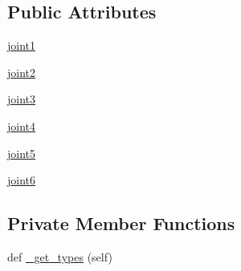 \subsection*{Public Attributes}
\begin{DoxyCompactItemize}
\item 
\hyperlink{classjaco__msgs_1_1msg_1_1__JointAngles_1_1JointAngles_a8be523d467fa53d4135c9d2886b97581}{joint1}
\item 
\hyperlink{classjaco__msgs_1_1msg_1_1__JointAngles_1_1JointAngles_a2a6a4e51ad21da90c02fa3f2f4522c2c}{joint2}
\item 
\hyperlink{classjaco__msgs_1_1msg_1_1__JointAngles_1_1JointAngles_afa25a110a90e720afd3b53454034f6cd}{joint3}
\item 
\hyperlink{classjaco__msgs_1_1msg_1_1__JointAngles_1_1JointAngles_a63efb8f5a7a09f5747508607924a164a}{joint4}
\item 
\hyperlink{classjaco__msgs_1_1msg_1_1__JointAngles_1_1JointAngles_ade1528f8e4d6132a7a6067ddf91a66f7}{joint5}
\item 
\hyperlink{classjaco__msgs_1_1msg_1_1__JointAngles_1_1JointAngles_ac1c8aa58c2bb7efd3ca6f1711bd425ee}{joint6}
\end{DoxyCompactItemize}
\subsection*{Private Member Functions}
\begin{DoxyCompactItemize}
\item 
def \hyperlink{classjaco__msgs_1_1msg_1_1__JointAngles_1_1JointAngles_a5f265557aa1f0890cba7baee8775736d}{\+\_\+get\+\_\+types} (self)
\end{DoxyCompactItemize}
